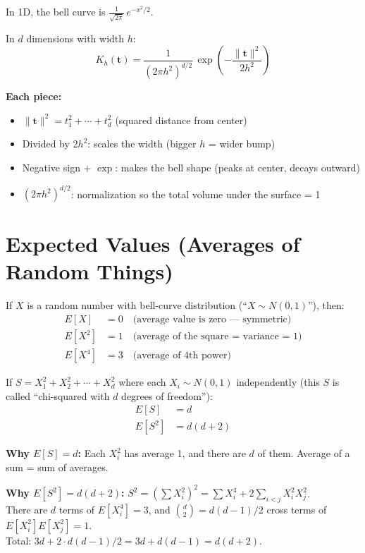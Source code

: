 \documentclass[12pt]{article}
\newcommand{\mathnote}[1]{\begin{tcolorbox}[colback=yellow!5,colframe=yellow!60!black,breakable]#1\end{tcolorbox}}
\begin{document}
In 1D, the bell curve is $\frac{1}{\sqrt{2\pi}}\,e^{-x^2/2}$.

In $d$ dimensions with width $h$:
$$K_h(\mathbf{t}) = \frac{1}{(2\pi h^2)^{d/2}}\,\exp\!\left(-\frac{\|\mathbf{t}\|^2}{2h^2}\right)$$

\mathnote{
\textbf{Each piece:}
\begin{itemize}
\item $\|\mathbf{t}\|^2 = t_1^2 + \cdots + t_d^2$ (squared distance from center)
\item Divided by $2h^2$: scales the width (bigger $h$ = wider bump)
\item Negative sign + $\exp$: makes the bell shape (peaks at center, decays outward)
\item $(2\pi h^2)^{d/2}$: normalization so the total volume under the surface = 1
\end{itemize}
}

\section{Expected Values (Averages of Random Things)}

If $X$ is a random number with bell-curve distribution (``$X \sim N(0,1)$''), then:
\begin{align*}
E[X] &= 0 \quad\text{(average value is zero --- symmetric)}\\
E[X^2] &= 1 \quad\text{(average of the square = variance = 1)}\\
E[X^4] &= 3 \quad\text{(average of 4th power)}
\end{align*}

If $S = X_1^2 + X_2^2 + \cdots + X_d^2$ where each $X_i \sim N(0,1)$ independently (this $S$ is called ``chi-squared with $d$ degrees of freedom''):
\begin{align*}
E[S] &= d\\
E[S^2] &= d(d+2)
\end{align*}

\mathnote{
\textbf{Why $E[S] = d$:} Each $X_i^2$ has average 1, and there are $d$ of them. Average of a sum = sum of averages.

\textbf{Why $E[S^2] = d(d+2)$:} $S^2 = (\sum X_i^2)^2 = \sum X_i^4 + 2\sum_{i<j} X_i^2 X_j^2$.\\
There are $d$ terms of $E[X_i^4] = 3$, and $\binom{d}{2} = d(d-1)/2$ cross terms of $E[X_i^2]E[X_j^2] = 1$.\\
Total: $3d + 2 \cdot d(d-1)/2 = 3d + d(d-1) = d(d+2)$.
}
\end{document}
